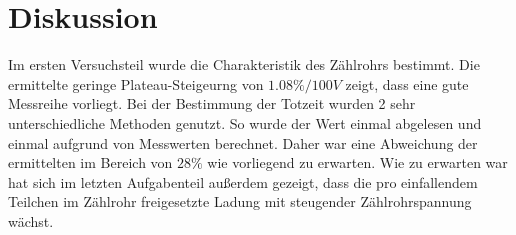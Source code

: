 \section{Diskussion}
\label{sec:Diskussion}
Im ersten Versuchsteil wurde die Charakteristik des Zählrohrs bestimmt. Die ermittelte
geringe Plateau-Steigeurng von $1.08\%/100𝑉$ zeigt, dass eine gute Messreihe vorliegt. Bei
der Bestimmung der Totzeit wurden 2 sehr unterschiedliche Methoden genutzt. So wurde
der Wert einmal abgelesen und einmal aufgrund von Messwerten berechnet. Daher war
eine Abweichung der ermittelten im Bereich von $28\%$ wie vorliegend zu erwarten. Wie zu erwarten war hat sich im letzten Aufgabenteil außerdem gezeigt, dass die pro einfallendem Teilchen im Zählrohr freigesetzte Ladung mit steugender Zählrohrspannung wächst. 